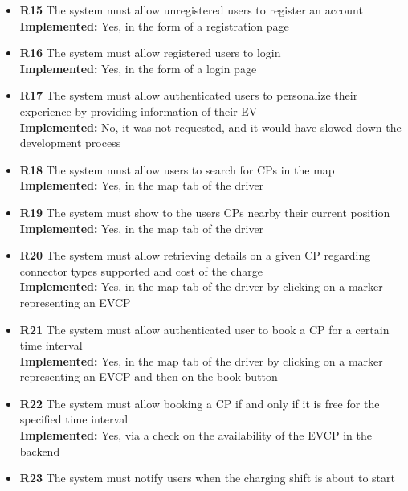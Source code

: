 \begin{itemize}
    \item        \textbf{R15} The system must allow unregistered users to register an account                                                   \\
          \textbf{Implemented:} Yes, in the form of a registration page
    \item        \textbf{R16} The system must allow registered users to login                                                                   \\
          \textbf{Implemented:} Yes, in the form of a login page
    \item        \textbf{R17} The system must allow authenticated users to personalize their experience by providing information of their EV    \\
          \textbf{Implemented:} No, it was not requested, and it would have slowed down the development process
    \item        \textbf{R18} The system must allow users to search for CPs in the map                                                          \\
          \textbf{Implemented:} Yes, in the map tab of the driver
    \item        \textbf{R19} The system must show to the users CPs nearby their current position                                               \\
          \textbf{Implemented:} Yes, in the map tab of the driver
    \item        \textbf{R20} The system must allow retrieving details on a given CP regarding connector types supported and cost of the charge \\
          \textbf{Implemented:} Yes, in the map tab of the driver by clicking on a marker representing an EVCP
    \item        \textbf{R21} The system must allow authenticated user to book a CP for a certain time interval                                 \\
          \textbf{Implemented:} Yes, in the map tab of the driver by clicking on a marker representing an EVCP and then on the book button
    \item        \textbf{R22} The system must allow booking a CP if and only if it is free for the specified time interval                      \\
          \textbf{Implemented:} Yes, via a check on the availability of the EVCP in the backend
    \item        \textbf{R23} The system must notify users when the charging shift is about to start                                            \\

\end{itemize}
